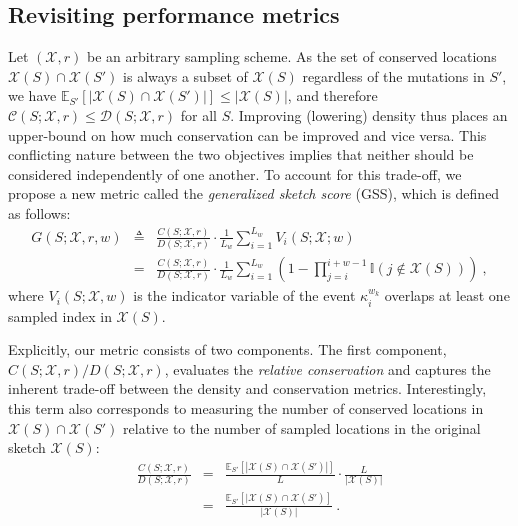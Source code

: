 \label{sec:analysis}
\subsection{Revisiting performance metrics}
\label{sec:metric}
Let $(\mathcal{X}, r)$ be an arbitrary sampling scheme. As the set of conserved locations $\mathcal{X}(S)\cap\mathcal{X}(S')$ is always a subset of $\mathcal{X}(S)$ regardless of the mutations in $S'$, we have $\mathbb{E}_{S'}\left[|\mathcal{X}(S)\cap\mathcal{X}(S')|\right] \leq |\mathcal{X}(S)|$, and therefore $\mathcal{C}(S;\mathcal{X},r) \leq \mathcal{D}(S;\mathcal{X},r)$ for all $S$. Improving (lowering) density thus places an upper-bound on how much conservation can be improved and vice versa. This conflicting nature between the two objectives implies that neither should be considered independently of one another. To account for this trade-off, we propose a new metric called the \emph{generalized sketch score} (GSS), which is defined as follows:
\begin{eqnarray}
G(S; \mathcal{X}, r, w) & \triangleq & \frac{C(S;\mathcal{X},r)}{D(S;\mathcal{X},r)} \cdot \frac{1}{L_w} \sum_{i=1}^{L_w} V_i(S; \mathcal{X}; w) \nonumber \\
&=& \frac{C(S; \mathcal{X}, r)}{D(S;\mathcal{X}, r)} \cdot \frac{1}{L_w} \sum_{i=1}^{L_w} \left(1 - \prod_{j=i}^{i+w-1} \mathbb{I}(j \not\in \mathcal{X}(S)) \right) \ ,
\end{eqnarray}
where $V_i(S;\mathcal{X}, w)$ is the indicator variable of the event $\kappa^{w_k}_i$ overlaps at least one sampled index in $\mathcal{X}(S)$. 

Explicitly, our metric consists of two components. The first component, $C(S;\mathcal{X},r)/D(S;\mathcal{X},r)$, evaluates the \textit{relative conservation} and captures the inherent trade-off between the density and conservation metrics. Interestingly, this term also corresponds to measuring the number of conserved locations in $\mathcal{X}(S)\cap\mathcal{X}(S')$ relative to the number of sampled locations in the original sketch $\mathcal{X}(S)$:
\begin{eqnarray}
\frac{C(S;\mathcal{X}, r)}{D(S;\mathcal{X},r)} &=&
\frac{\mathbb{E}_{S'}\left[|\mathcal{X}(S)\cap\mathcal{X}(S')|\right]}{L}\cdot\frac{L}{|\mathcal{X} (S)|} \nonumber \\
&=& \frac{\mathbb{E}_{S'}\left[|\mathcal{X}(S)\cap\mathcal{X}(S')\right]}{|\mathcal{X}(S)|} \ .
\end{eqnarray}

